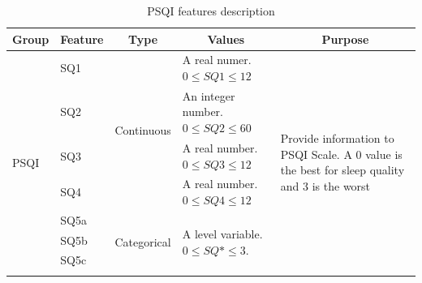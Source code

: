\documentclass[]{book}
\begin{document}
\begin{table}[ht]
    \centering
    \caption{PSQI features description}
    \label{tab:psqi-features-description}
    \begin{tabular}{|l|l|l|p{3cm}|p{5cm}|}
        \hline
        \multicolumn{1}{|c|}{\textbf{Group}} & \multicolumn{1}{c|}{\textbf{Feature}} & \multicolumn{1}{c|}{\textbf{Type}} & \multicolumn{1}{c|}{\textbf{Values}}                    & \multicolumn{1}{c|}{\textbf{Purpose}}                                                                              \\ \hline
        \multirow{18}{*}{PSQI}               & SQ1                                   & \multirow{4}{*}{Continuous}        & A real numer.   $ 0 \leq  SQ1 \leq 12 $                    & \multirow{18}{5cm}{Provide information to PSQI Scale. A 0 value is the best for sleep quality and 3 is the worst} \\ \cline{2-2} \cline{4-4}
        & SQ2                                   &                                    & An integer number. $ 0 \leq SQ2 \leq 60 $               &                                                                                                                 \\ \cline{2-2} \cline{4-4}
        & SQ3                                   &                                    & A real number. $ 0 \leq SQ3 \leq 12 $                      &                                                                                                                 \\ \cline{2-2} \cline{4-4}
        & SQ4                                   &                                    & A real number. $ 0 \leq SQ4 \leq 12 $                      &                                                                                                                 \\ \cline{2-4}
        & SQ5a                                  & \multirow{14}{*}{Categorical}      & \multirow{14}{3cm}{A level variable. $ 0 \leq SQ* \leq 3 $.} &                                                                                                                 \\ \cline{2-2}
        & SQ5b                                  &                                    &                                                         &                                                                                                                 \\ \cline{2-2}
        & SQ5c                                  &                                    &                                                         &                                                                                                                 \\ \cline{2-2}

\end{tabular}
\end{table}
\end{document}
